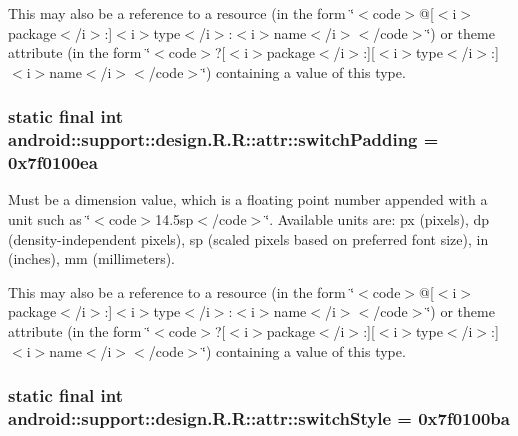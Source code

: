 This may also be a reference to a resource (in the form \char`\"{}$<$code$>$@\mbox{[}$<$i$>$package$<$/i$>$:\mbox{]}$<$i$>$type$<$/i$>$:$<$i$>$name$<$/i$>$$<$/code$>$\char`\"{}) or theme attribute (in the form \char`\"{}$<$code$>$?\mbox{[}$<$i$>$package$<$/i$>$:\mbox{]}\mbox{[}$<$i$>$type$<$/i$>$:\mbox{]}$<$i$>$name$<$/i$>$$<$/code$>$\char`\"{}) containing a value of this type. \hypertarget{classandroid_1_1support_1_1design_1_1_r_1_1attr_cb631e1d131f58cee6cd52cb553bb079}{
\subsubsection[{switchPadding}]{\setlength{\rightskip}{0pt plus 5cm}static final int android::support::design.R.R::attr::switchPadding = 0x7f0100ea}}
\label{classandroid_1_1support_1_1design_1_1_r_1_1attr_cb631e1d131f58cee6cd52cb553bb079}


Must be a dimension value, which is a floating point number appended with a unit such as \char`\"{}$<$code$>$14.5sp$<$/code$>$\char`\"{}. Available units are: px (pixels), dp (density-independent pixels), sp (scaled pixels based on preferred font size), in (inches), mm (millimeters). 

This may also be a reference to a resource (in the form \char`\"{}$<$code$>$@\mbox{[}$<$i$>$package$<$/i$>$:\mbox{]}$<$i$>$type$<$/i$>$:$<$i$>$name$<$/i$>$$<$/code$>$\char`\"{}) or theme attribute (in the form \char`\"{}$<$code$>$?\mbox{[}$<$i$>$package$<$/i$>$:\mbox{]}\mbox{[}$<$i$>$type$<$/i$>$:\mbox{]}$<$i$>$name$<$/i$>$$<$/code$>$\char`\"{}) containing a value of this type. \hypertarget{classandroid_1_1support_1_1design_1_1_r_1_1attr_ccf0cc9a92bdea4bd19fbc09a2f0bb66}{
\subsubsection[{switchStyle}]{\setlength{\rightskip}{0pt plus 5cm}static final int android::support::design.R.R::attr::switchStyle = 0x7f0100ba}}
\label{classandroid_1_1support_1_1design_1_1_r_1_1attr_ccf0cc9a92bdea4bd19fbc09a2f0bb66}


